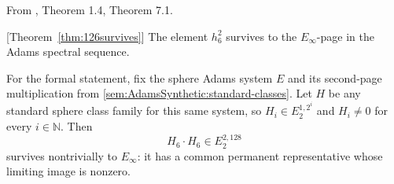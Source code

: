 \begin{theorem}[Permanence of $h_6^2$]
\label{paper:1.4}
\label{paper:7.1}
\label{thm:126survives}
From \cite{LWX126}, Theorem 1.4, Theorem 7.1.\par
[Theorem~\ref{thm:126survives}] \label{thm:h_6_sq}\label{thm:h62}
    The element $h_6^2$ survives to the $E_\infty$-page in the Adams spectral sequence.

For the formal statement, fix the sphere Adams system $E$ and its
second-page multiplication from
\ref{sem:AdamsSynthetic:standard-classes}. Let $H$ be any standard sphere
class family for this same system, so
$H_i\in E_2^{1,2^i}$ and $H_i\ne0$ for every $i\in\mathbb N$. Then
\[
H_6\cdot H_6\in E_2^{2,128}
\]
survives nontrivially to $E_\infty$: it has a common permanent
representative whose limiting image is nonzero.


\end{theorem}
